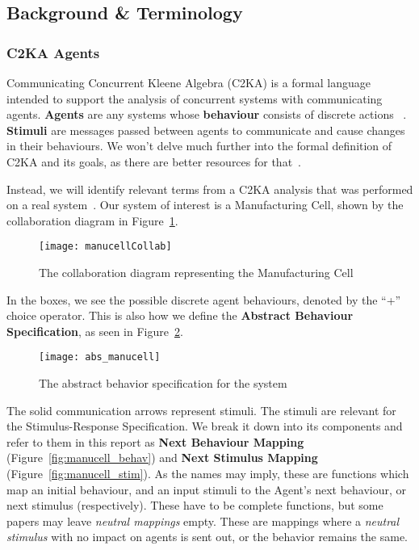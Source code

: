 \subsection{Background \& Terminology}\label{subsec:background-&-terminology}
\subsubsection{C2KA Agents}\label{subsubsec:c2ka-agents}
Communicating Concurrent Kleene Algebra (C2KA) is a formal language intended to support the analysis of concurrent systems with communicating agents. %
\textbf{Agents} are any systems whose \textbf{behaviour} consists of discrete actions ~\cite{c2ka_foundations}.
\textbf{Stimuli} are messages passed between agents to communicate and cause changes in their behaviours.
We won't delve much further into the formal definition of C2KA and its goals,
as there are better resources for that~\cite{c2ka_foundations, implicit_interactions}.

Instead, we will identify relevant terms from a C2KA analysis that was performed on a real system~\cite{manu_cell}.
Our system of interest is a Manufacturing Cell, shown by the collaboration diagram in Figure~\ref{fig:manucell-collab}.

\begin{figure}[h]
    \centering
    \texttt{[image: manucellCollab]}
    \caption{The collaboration diagram representing the Manufacturing Cell~\cite{manu_cell}}
    \label{fig:manucell-collab}
\end{figure}

In the boxes, we see the possible discrete agent behaviours, denoted by the ``+'' choice operator.
This is also how we define the \textbf{Abstract Behaviour Specification}, as seen in Figure~\ref{fig:abstractmc}.
\begin{figure}[h]
    \centering
    \texttt{[image: abs\_manucell]}
    \caption{The abstract behavior specification for the system~\cite{manu_cell}}
    \label{fig:abstractmc}
\end{figure}

\newpage
The solid communication arrows represent stimuli.
The stimuli are relevant for the Stimulus-Response Specification.
We break it down into its components and refer to them in this report as \textbf{Next Behaviour Mapping} (Figure~\ref{fig:manucell_behav})
and \textbf{Next Stimulus Mapping} (Figure~\ref{fig:manucell_stim}).
As the names may imply, these are functions which map an initial behaviour, and an input stimuli to the Agent's next behaviour, or next stimulus (respectively).
These have to be complete functions, but some papers may leave \textit{neutral mappings} empty.
These are mappings where a \textit{neutral stimulus} with no impact on agents is sent out, or the behavior remains the same.

